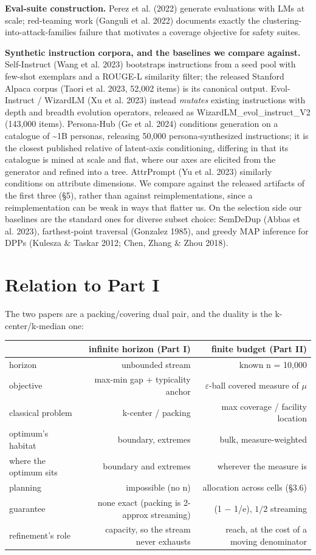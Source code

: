 \documentclass[11pt]{article}
\theoremstyle{plain}
\theoremstyle{definition}
\begin{document}
\textbf{Eval-suite construction.} Perez et al. (2022) generate evaluations with LMs at scale; red-teaming work (Ganguli et al. 2022) documents exactly the clustering-into-attack-families failure that motivates a coverage objective for safety suites.

\textbf{Synthetic instruction corpora, and the baselines we compare against.} Self-Instruct (Wang et al. 2023) bootstraps instructions from a seed pool with few-shot exemplars and a ROUGE-L similarity filter; the released Stanford Alpaca corpus (Taori et al. 2023, 52,002 items) is its canonical output. Evol-Instruct / WizardLM (Xu et al. 2023) instead \emph{mutates} existing instructions with depth and breadth evolution operators, released as WizardLM\_evol\_instruct\_V2 (143,000 items). Persona-Hub (Ge et al. 2024) conditions generation on a catalogue of \textasciitilde{}1B personas, releasing 50,000 persona-synthesized instructions; it is the closest published relative of latent-axis conditioning, differing in that its catalogue is mined at scale and flat, where our axes are elicited from the generator and refined into a tree. AttrPrompt (Yu et al. 2023) similarly conditions on attribute dimensions. We compare against the released artifacts of the first three (\S{}5), rather than against reimplementations, since a reimplementation can be weak in ways that flatter us. On the selection side our baselines are the standard ones for diverse subset choice: SemDeDup (Abbas et al. 2023), farthest-point traversal (Gonzalez 1985), and greedy MAP inference for DPPs (Kulesza \& Taskar 2012; Chen, Zhang \& Zhou 2018).

\section{Relation to Part I}
The two papers are a packing/covering dual pair, and the duality is the k-center/k-median one:

\begin{table}[htbp]
\centering
\small
\begin{tabular}{lrr}
\toprule
\textbf{} & \textbf{infinite horizon (Part I)} & \textbf{finite budget (Part II)} \\
\midrule
horizon & unbounded stream & known n = 10,000 \\
objective & max-min gap + typicality anchor & $\varepsilon$-ball covered measure of $\mu$ \\
classical problem & k-center / packing & max coverage / facility location \\
optimum's habitat & boundary, extremes & bulk, measure-weighted \\
where the optimum sits & boundary and extremes & wherever the measure is \\
planning & impossible (no n) & allocation across cells (\S{}3.6) \\
guarantee & none exact (packing is 2-approx streaming) & (1 $-$ 1/e), $1/2$ streaming \\
refinement's role & capacity, so the stream never exhausts & reach, at the cost of a moving denominator \\
\bottomrule
\end{tabular}
\end{table}
\end{document}
